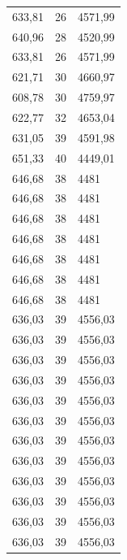 \begin{center}
\begin{longtable}{|l|l|l|}
633,81            & 26               & 4571,99        \\
640,96            & 28               & 4520,99        \\
633,81            & 26               & 4571,99        \\
621,71            & 30               & 4660,97        \\
608,78            & 30               & 4759,97        \\
622,77            & 32               & 4653,04        \\
631,05            & 39               & 4591,98        \\
651,33            & 40               & 4449,01        \\
646,68            & 38               & 4481           \\
646,68            & 38               & 4481           \\
646,68            & 38               & 4481           \\
646,68            & 38               & 4481           \\
646,68            & 38               & 4481           \\
646,68            & 38               & 4481           \\
646,68            & 38               & 4481           \\
636,03            & 39               & 4556,03        \\
636,03            & 39               & 4556,03        \\
636,03            & 39               & 4556,03        \\
636,03            & 39               & 4556,03        \\
636,03            & 39               & 4556,03        \\
636,03            & 39               & 4556,03        \\
636,03            & 39               & 4556,03        \\
636,03            & 39               & 4556,03        \\
636,03            & 39               & 4556,03        \\
636,03            & 39               & 4556,03        \\
636,03            & 39               & 4556,03        \\
636,03            & 39               & 4556,03        \\

\end{longtable}
\end{center}

